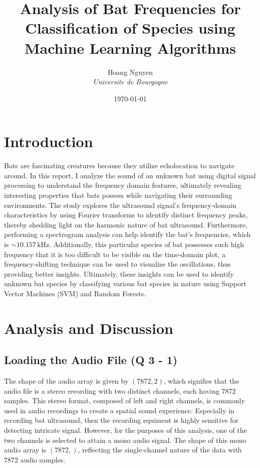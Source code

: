 \documentclass[twocolumn]{article}[ht]
\title{Analysis of Bat Frequencies for Classification of Species using Machine Learning Algorithms}
\author{Hoang Nguyen \\ \textit{Universite de Bourgogne}}
\date{\today}
\begin{document}
\maketitle

\section{Introduction}
    \text Bats are fascinating creatures because they utilize echolocation to navigate around. In this report, I analyze the sound of an unknown bat using digital signal processing to understand the frequency domain features, ultimately revealing interesting properties that bats possess while navigating their surrounding environments. The study explores the ultrasound signal's frequency-domain characteristics by using Fourier transforms to identify distinct frequency peaks, thereby shedding light on the harmonic nature of bat ultrasound. Furthermore, performing a spectrogram analysis can help identify the bat's frequencies, which is $\sim10.157\,\text{kHz}$. Additionally, this particular species of bat possesses such high frequency that it is too difficult to be visible on the time-domain plot, a frequency-shifting technique can be used to visualize the oscillations, thus providing better insights. Ultimately, these insights can be used to identify unknown bat species by classifying various bat species in nature using Support Vector Machines (SVM) and Random Forests.
    
\section{Analysis and Discussion}
\subsection{Loading the Audio File (Q 3 - 1)}
The shape of the audio array is given by $(7872, 2)$, which signifies that the audio file is a stereo recording with two distinct channels, each having $7872$ samples. This stereo format, composed of left and right channels, is commonly used in audio recordings to create a spatial sound experience. Especially in recording bat ultrasound, then the recording equiment is highly sensitive for detecting intricate signal. However, for the purposes of this analysis, one of the two channels is selected to attain a mono audio signal. The shape of this mono audio array is $(7872,)$, reflecting the single-channel nature of the data with $7872$ audio samples.
\end{document}
